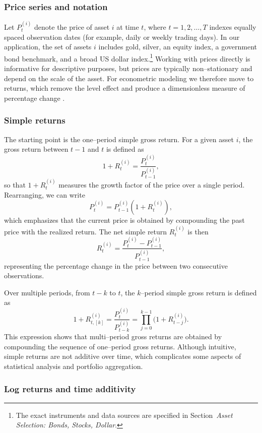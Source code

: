 \subsubsection{Price series and notation}

Let $P^{(i)}_t$ denote the price of asset $i$ at time $t$, where $t = 1,2,\dots,T$ indexes
equally spaced observation dates (for example, daily or weekly trading days). In our
application, the set of assets $i$ includes gold, silver, an equity index, a government bond
benchmark, and a broad US dollar index.\footnote{The exact instruments and data sources
are specified in Section~\textit{Asset Selection: Bonds, Stocks, Dollar}.}
Working with prices directly is informative for descriptive purposes, but prices are typically 
non–stationary and depend on the scale of the asset. For econometric modeling we therefore
move to returns, which remove the level effect and produce a dimensionless measure of
percentage change .
\subsubsection{Simple returns}

The starting point is the one–period simple gross return. For a given asset $i$, the gross
return between $t-1$ and $t$ is defined as
\[
1 + R^{(i)}_t = \frac{P^{(i)}_t}{P^{(i)}_{t-1}},
\]
so that $1 + R^{(i)}_t$ measures the growth factor of the price over a single period. 
Rearranging, we can write
\[
P^{(i)}_t = P^{(i)}_{t-1} (1 + R^{(i)}_t),
\]
which emphasizes that the current price is obtained by compounding the past price with the
realized return. The net simple return $R^{(i)}_t$ is then
\[
R^{(i)}_t = \frac{P^{(i)}_t - P^{(i)}_{t-1}}{P^{(i)}_{t-1}},
\]
representing the percentage change in the price between two consecutive observations.

Over multiple periods, from $t-k$ to $t$, the $k$–period simple gross return is defined as
\[
1 + R^{(i)}_{t,[k]} = \frac{P^{(i)}_t}{P^{(i)}_{t-k}}
= \prod_{j=0}^{k-1} \bigl(1 + R^{(i)}_{t-j}\bigr).
\]
This expression shows that multi–period gross returns are obtained by compounding the
sequence of one–period gross returns. Although intuitive, simple returns are not additive
over time, which complicates some aspects of statistical analysis and portfolio aggregation.
\subsubsection{Log returns and time additivity}

